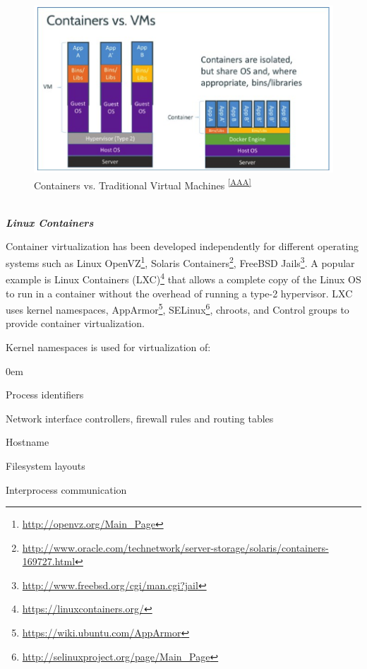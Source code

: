 \documentclass[a4paper,11pt,twoside]{report}
\begin{document}
\begin{figure}[!ht]
  \centering
     \includegraphics[scale=1]{containervsvm}
  \caption{Containers vs. Traditional Virtual Machines \textsuperscript{\ref{AAA}}}%
  \label{vm vs container}  
\end{figure}
\vspace{-18pt}


\noindent
\\\textbf{\textit{Linux Containers}}

\noindent
Container virtualization has been developed independently for different operating systems such as Linux OpenVZ\footnote{\url{http://openvz.org/Main_Page}}, Solaris Containers\footnote{\url{http://www.oracle.com/technetwork/server-storage/solaris/containers-169727.html}}, FreeBSD Jails\footnote{\url{http://www.freebsd.org/cgi/man.cgi?jail}}. A popular example is Linux Containers (LXC)\footnote{\label{LCX} \url{https://linuxcontainers.org/}} that allows a complete copy of the Linux OS to run in a container without the overhead of running a type-2 hypervisor. LXC uses kernel namespaces, AppArmor\footnote{\url{https://wiki.ubuntu.com/AppArmor}}, SELinux\footnote{\url{http://selinuxproject.org/page/Main_Page}}, chroots, and Control groups to provide container virtualization. 

\noindent
Kernel namespaces is used for virtualization of:

\begin{list}{-}{}
  \itemsep0em
  \item Process identifiers
  \item Network interface controllers, firewall rules and routing tables
  \item Hostname
  \item Filesystem layouts 
  \item Interprocess communication
  \end{list}
\end{document}
